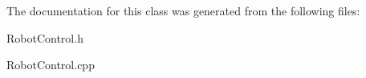 

The documentation for this class was generated from the following files\+:\begin{DoxyCompactItemize}
\item 
Robot\+Control.\+h\item 
Robot\+Control.\+cpp\end{DoxyCompactItemize}
